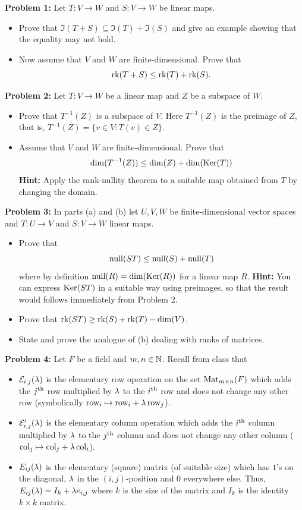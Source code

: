 \documentclass[11pt]{amsart}
\begin{document}
\skv
{\bf Problem 1: } Let $T:V\to W$ and $S:V\to W$ be linear maps.
\begin{itemize}
\item[(a)] Prove that $\Im(T+S)\subseteq \Im(T)+\Im(S)$ and give an example showing that the equality may not hold.
\item[(b)] Now assume that $V$ and $W$
are finite-dimensional. Prove that $${\rm rk}(T+S)\leq {\rm rk}(T)+{\rm rk}(S).$$
\end{itemize}
\skv
{\bf Problem 2: } Let $T:V\to W$ be a linear map and $Z$ be a subspace of $W$.
\begin{itemize}
\item[(a)] Prove that $T^{-1}(Z)$ is a subspace of $V$. Here $T^{-1}(Z)$ is the preimage of $Z$,
that is, $T^{-1}(Z)=\{v\in V: T(v)\in Z\}$.
\item[(b)] Assume that $V$ and $W$ are finite-dimensional. Prove that $$\dim(T^{-1}(Z))\leq \dim (Z)+\dim({\rm Ker}(T))$$
{\bf Hint:} Apply the rank-nullity theorem to a suitable map obtained from $T$ by changing the domain.
\end{itemize}
\skv
{\bf Problem 3: } In parts (a) and (b) let $U,V,W$ be finite-dimensional vector spaces
and $T:U\to V$ and $S:V\to W$ linear maps. 
\begin{itemize}
\item[(a)] Prove that $${\rm null}(ST)\leq {\rm null}(S)+{\rm null}(T)$$
where by definition ${\rm null}(R)=\dim({\rm Ker}(R))$ for a linear map $R$. {\bf Hint:} You can express ${\rm Ker}(ST)$
in a suitable way using preimages, so that the result would follows immediately from Problem 2.
\item[(b)] Prove that ${\rm rk}(ST)\geq {\rm rk}(S)+{\rm rk}(T)-\dim(V)$.
\item[(c)] State and prove the analogue of (b) dealing with ranks of matrices.
\end{itemize}
\skv
{\bf Problem 4:} Let $F$ be a field and $m,n\in{\mathbb N}$. Recall from class that 
\begin{itemize}
\item[(i)] $\mathcal E_{i,j}({\lambda})$
is the elementary row operation on the set ${\rm Mat}_{m\times n}(F)$ which
adds the $j^{\rm th}$ row multiplied by ${\lambda}$ to the $i^{\rm th}$ row and does not change any other row
(symbolically ${\rm row}_i\mapsto {\rm row}_i+{\lambda}\, {\rm row}_j$).
\item[(ii)] $\mathcal E'_{i,j}({\lambda})$ is the elementary column operation which  adds the $i^{\rm th}$ column multiplied by 
${\lambda}$ to the $j^{\rm th}$ column and does not change any other column
(${\rm col}_j\mapsto {\rm col}_j+{\lambda}\, {\rm col}_i$).
\item[(iii)] $E_{ij}({\lambda})$ is the elementary (square) matrix (of suitable size) which has $1$'s on the diagonal,
${\lambda}$ in the $(i,j)$-position and $0$ everywhere else. Thus, $E_{ij}({\lambda})=I_k+{\lambda} e_{i,j}$ where $k$ is the size of 
the matrix and $I_k$ is the identity $k\times k$ matrix.
\end{itemize}
\end{document}
